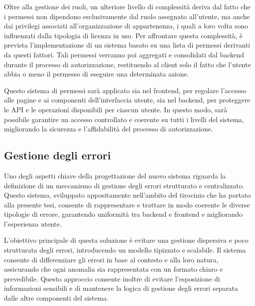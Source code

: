 Oltre alla gestione dei ruoli, un ulteriore livello di complessità deriva dal fatto che i permessi non dipendono esclusivamente dal ruolo assegnato all'utente, ma anche dai privilegi associati all’organizzazione di appartenenza, i quali a loro volta sono influenzati dalla tipologia di licenza in uso. Per affrontare questa complessità, è prevista l'implementazione di un sistema basato su una lista di permessi derivanti da questi fattori. Tali permessi verranno poi aggregati e consolidati dal backend durante il processo di autorizzazione, restituendo al client solo il fatto che l'utente abbia o meno il permesso di eseguire una determinata azione.

Questo sistema di permessi sarà applicato sia nel frontend, per regolare l'accesso alle pagine e ai componenti dell'interfaccia utente, sia nel backend, per proteggere le API e le operazioni disponibili per ciascun utente. In questo modo, sarà possibile garantire un accesso controllato e coerente su tutti i livelli del sistema, migliorando la sicurezza e l’affidabilità del processo di autorizzazione.

\subsection{Gestione degli errori}
Uno degli aspetti chiave della progettazione del nuovo sistema riguarda la definizione di un meccanismo di gestione degli errori strutturato e centralizzato. Questo sistema, sviluppato appositamente nell’ambito del tirocinio che ha portato alla presente tesi, consente di rappresentare e trattare in modo coerente le diverse tipologie di errore, garantendo uniformità tra backend e frontend e migliorando l’esperienza utente.

L'obiettivo principale di questa soluzione è evitare una gestione dispersiva e poco strutturata degli errori, introducendo un modello tipizzato e scalabile. Il sistema consente di differenziare gli errori in base al contesto e alla loro natura, assicurando che ogni anomalia sia rappresentata con un formato chiaro e prevedibile. Questo approccio consente inoltre di evitare l'esposizione di informazioni sensibili e di mantenere la logica di gestione degli errori separata dalle altre componenti del sistema.

